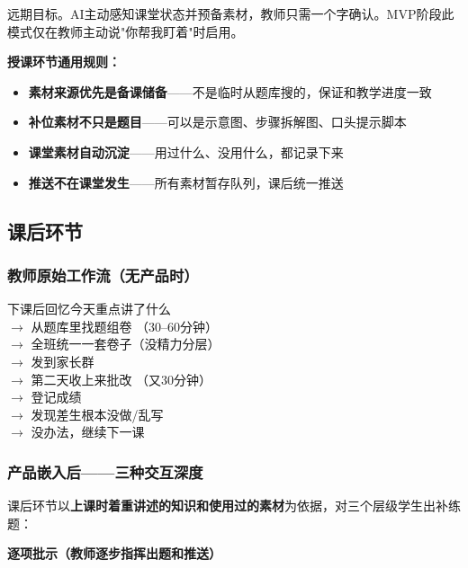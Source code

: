 \documentclass[11pt,a4paper]{article}
\newcommand{\done}{\ding{192}}
\begin{document}
远期目标。AI主动感知课堂状态并预备素材，教师只需一个字确认。MVP阶段此模式仅在教师主动说"你帮我盯着"时启用。

\bigskip
\noindent\textbf{授课环节通用规则：}
\begin{itemize}[leftmargin=2em,nosep]
  \item \textbf{素材来源优先是备课储备}——不是临时从题库搜的，保证和教学进度一致
  \item \textbf{补位素材不只是题目}——可以是示意图、步骤拆解图、口头提示脚本
  \item \textbf{课堂素材自动沉淀}——用过什么、没用什么，都记录下来
  \item \textbf{推送不在课堂发生}——所有素材暂存队列，课后统一推送
\end{itemize}

\subsection{课后环节}

\subsubsection*{教师原始工作流（无产品时）}

\begin{oldflow}
下课后回忆今天重点讲了什么\\
$\rightarrow$ 从题库里找题组卷 \hfill（30--60分钟）\\
$\rightarrow$ 全班统一一套卷子（没精力分层）\\
$\rightarrow$ 发到家长群\\
$\rightarrow$ 第二天收上来批改 \hfill（又30分钟）\\
$\rightarrow$ 登记成绩\\
$\rightarrow$ 发现差生根本没做/乱写\\
$\rightarrow$ 没办法，继续下一课
\end{oldflow}

\subsubsection*{产品嵌入后——三种交互深度}

课后环节以\textbf{上课时着重讲述的知识和使用过的素材}为依据，对三个层级学生出补练题：

\bigskip
\noindent\textbf{\done{} 逐项批示（教师逐步指挥出题和推送）}
\end{document}
